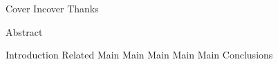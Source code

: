 \documentclass[12pt,a4paper,twoside]{book}
\renewcommand{\^}[1]{\ensuremath{\mathcal{#1}}}
\renewcommand{\^}[1]{\ensuremath{\mathcal{#1}}}
\begin{document}
\frontmatter

\pagestyle{empty}
\frenchspacing
\setcounter{page}{-11}
{Cover}
{Incover}
\thispagestyle{empty}
{Thanks}

{Abstract}

\pagestyle{fancy}
\fancyhead{} %
\fancyhead[CO]{\textsc{\nouppercase{\leftmark}}}
\tableofcontents
\listoffigures

\mainmatter

{Introduction}
{Related}
{Main}
{Main}
{Main}
{Main}
{Main}
{Conclusions}

\newpage{}

\end{document}
